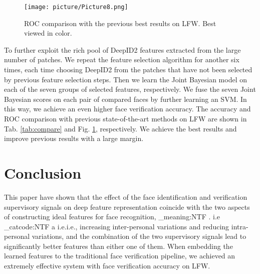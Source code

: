 \documentclass{article} \usepackage{nips14submit_e,times}
\makeatletter
\newcommand\latinabbrev[1]{
  \peek_meaning:NTF . {#1\@}{ \peek_catcode:NTF a {#1.\@ }{#1.\@}}}
\def\ie{\latinabbrev{i.e}}
\makeatother
\begin{document}
\begin{figure}[!h]
\begin{center}
\texttt{[image: picture/Picture8.png]}
\end{center}
\vspace{-0.2in}
\caption{ROC comparison with the previous best results on LFW. Best viewed in color.}
\label{fig:compare}
\vspace{-0.1in}
\end{figure}

To further exploit the rich pool of DeepID2 features extracted from the large number of patches. We repeat the feature selection algorithm for another six times, each time choosing DeepID2 from the patches that have not been selected by previous feature selection steps. Then we learn the Joint Bayesian model on each of the seven groups of selected features, respectively.
We fuse the seven Joint Bayesian scores on each pair of compared faces by further learning an SVM. In this way, we achieve an even higher  face verification accuracy.
The accuracy and ROC comparison with previous state-of-the-art methods on LFW are shown in Tab. \ref{tab:compare} and Fig. \ref{fig:compare}, respectively. We achieve the best results and improve previous results with a large margin.


\section{Conclusion}

This paper have shown that the effect of the face identification and verification supervisory signals on deep feature representation coincide with the two aspects of constructing ideal features for face recognition, \ie, increasing inter-personal variations and reducing intra-personal variations, and the combination of the two supervisory signals lead to significantly better features than either one of them. When embedding the learned features to the traditional face verification pipeline, we achieved an extremely effective system with  face verification accuracy on LFW.


{


}
\end{document}
